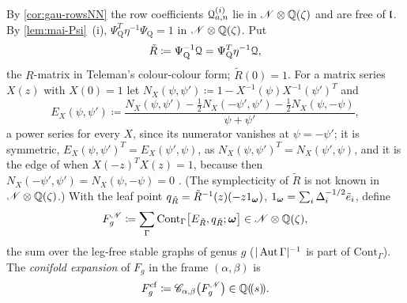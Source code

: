 \begin{defn}
\label{def:mai-Fcf}
By \cref{cor:gau-rowsNN} the row coefficients $\mathcal{Q}^{(i)}_{a,n}$ lie in $\mathscr{N}\otimes\mathbb{Q}(\zeta)$ and are free of $\mathfrak{l}$. By \cref{lem:mai-Psi}~(i), $\Psi_{\mathrm Q}^T\eta^{-1}\Psi_{\mathrm Q}=1$ in $\mathscr{N}\otimes\mathbb{Q}(\zeta)$. Put
\[
\tilde R\coloneqq\Psi_{\mathrm Q}^{-1}\mathcal{Q}=\Psi_{\mathrm Q}^T\eta^{-1}\mathcal{Q} ,
\]
the $R$-matrix in Teleman's colour-colour form; $\tilde R(0)=1$. For a matrix series $X(z)$ with $X(0)=1$ let $N_X(\psi,\psi')\coloneqq1-X^{-1}(\psi)X^{-1}(\psi')^T$ and
\[
E_X(\psi,\psi')\coloneqq\frac{N_X(\psi,\psi')-\frac12N_X(-\psi',\psi')-\frac12N_X(\psi,-\psi)}{\psi+\psi'} ,
\]
a power series for every $X$, since its numerator vanishes at $\psi=-\psi'$; it is symmetric, $E_X(\psi,\psi')^T=E_X(\psi',\psi)$, as $N_X(\psi,\psi')^T=N_X(\psi',\psi)$, and it is the edge of \cite[Def.~2.2]{PPZ15} when $X(-z)^TX(z)=1$, because then $N_X(-\psi',\psi')=N_X(\psi,-\psi)=0$ \cite[Rem.~2.1]{PPZ15}. (The symplecticity of $\tilde R$ is not known in $\mathscr{N}\otimes\mathbb{Q}(\zeta)$.) With the leaf point $q_{\tilde R}=\tilde R^{-1}(z)(-z1_{\boldsymbol{\omega}})$, $1_{\boldsymbol{\omega}}=\sum_i\Delta_i^{-1/2}\tilde e_i$, define
\[
F_g^{\mathscr{N}}\coloneqq\sum_\Gamma\mathrm{Cont}_\Gamma\bigl[E_{\tilde R},q_{\tilde R};\boldsymbol{\omega}\bigr]\in\mathscr{N}\otimes\mathbb{Q}(\zeta),
\]
the sum over the leg-free stable graphs of genus $g$ ($|\operatorname{Aut}\Gamma|^{-1}$ is part of $\mathrm{Cont}_\Gamma$). The \emph{conifold expansion} of $F_g$ in the frame $(\alpha,\beta)$ is
\[
F_g^{\mathrm{cf}}\coloneqq\mathscr{C}_{\alpha,\beta}\bigl(F_g^{\mathscr{N}}\bigr)\in\mathbb{Q}(\!(s)\!).
\]
\end{defn}

